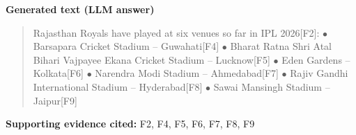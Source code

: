 \noindent\textcolor{kggenerated}{\textbf{Generated text (LLM answer)}}
\begin{quote}\small Rajasthan Royals have played at six venues so far in IPL 2026\textsf{[F2]}: \newline \quad$\bullet$ Barsapara Cricket Stadium -- Guwahati\textsf{[F4]} \newline \quad$\bullet$ Bharat Ratna Shri Atal Bihari Vajpayee Ekana Cricket Stadium -- Lucknow\textsf{[F5]} \newline \quad$\bullet$ Eden Gardens -- Kolkata\textsf{[F6]} \newline \quad$\bullet$ Narendra Modi Stadium -- Ahmedabad\textsf{[F7]} \newline \quad$\bullet$ Rajiv Gandhi International Stadium -- Hyderabad\textsf{[F8]} \newline \quad$\bullet$ Sawai Mansingh Stadium -- Jaipur\textsf{[F9]}\end{quote}
\noindent\textbf{Supporting evidence cited:} F2, F4, F5, F6, F7, F8, F9\par\medskip
